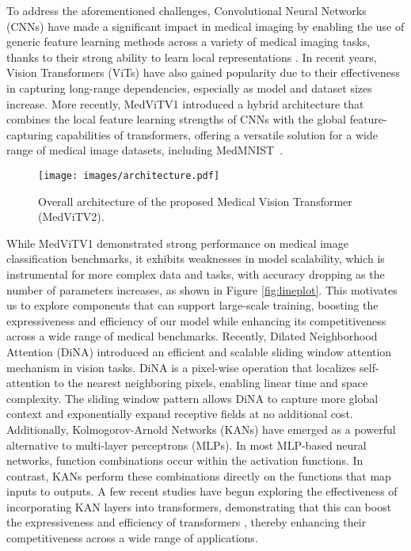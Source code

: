 \documentclass[times,twocolumn,final]{elsarticle}
\begin{document}
To address the aforementioned challenges, Convolutional Neural Networks (CNNs) have made a significant impact in medical imaging by enabling the use of generic feature learning methods across a variety of medical imaging tasks, thanks to their strong ability to learn local representations \cite{xu2024whole, bian2024broadband, zhu2024mp}. In recent years, Vision Transformers (ViTs) \cite{yang2024token, ling2023mtanet, wang2024recursive} have also gained popularity due to their effectiveness in capturing long-range dependencies, especially as model and dataset sizes increase. More recently, MedViTV1 \cite{manzari2023medvit} introduced a hybrid architecture that combines the local feature learning strengths of CNNs with the global feature-capturing capabilities of transformers, offering a versatile solution for a wide range of medical image datasets, including  MedMNIST~\cite{yang2023medmnist}.

\begin{figure*}[!th]
    \centering
    \texttt{[image: images/architecture.pdf]}
    \vspace{-4.5mm}
    \caption{Overall architecture of the proposed Medical Vision Transformer (MedViTV2).}
    \label{fig:overall_arch}
    \vspace{-3.5mm}
\end{figure*}

While MedViTV1 demonstrated strong performance on medical image classification benchmarks, it exhibits weaknesses in model scalability, which is instrumental for more complex data and tasks, with accuracy dropping as the number of parameters increases, as shown in Figure \ref{fig:lineplot}. This motivates us to explore components that can support large-scale training, boosting the expressiveness and efficiency of our model while enhancing its competitiveness across a wide range of medical benchmarks. Recently, Dilated Neighborhood Attention (DiNA) \cite{hassani2023neighborhood} introduced an efficient and scalable sliding window attention mechanism in vision tasks. DiNA is a pixel-wise operation that localizes self-attention to the nearest neighboring pixels, enabling linear time and space complexity. The sliding window pattern allows DiNA to capture more global context and exponentially expand receptive fields at no additional cost.
Additionally, Kolmogorov-Arnold Networks (KANs) \cite{liu2024kan} have emerged as a powerful alternative to multi-layer perceptrons (MLPs). In most MLP-based neural networks, function combinations occur within the activation functions. In contrast, KANs perform these combinations directly on the functions that map inputs to outputs. A few recent studies have begun exploring the effectiveness of incorporating KAN layers into transformers, demonstrating that this can boost the expressiveness and efficiency of transformers \cite{yang2024kolmogorov, genet2024temporal}, thereby enhancing their competitiveness across a wide range of applications.
\end{document}
